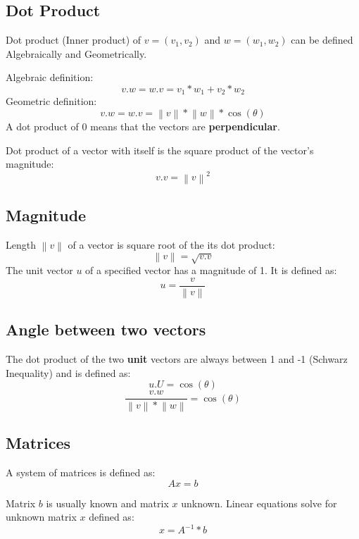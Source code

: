 \documentclass[10pt,a4paper]{article}
\begin{document}
\subsection{Dot Product}
Dot product (Inner product) of $v=(v_1, v_2)$ and $w=(w_1, w_2)$ can be defined Algebraically and Geometrically. \par
Algebraic definition:
$$v.w=w.v=v_1*w_1+v_2*w_2$$
Geometric definition:
$$v.w=w.v=\left \| v \right \|*\left \| w \right \|*\cos(\theta)$$
A dot product of 0 means that the vectors are \textbf{perpendicular}. \par 
Dot product of a vector with itself is the square product of the vector's magnitude:
$$v.v=\left \| v \right \|^2$$
\subsection{Magnitude}
Length $\left \| v \right \|$ of a vector is square root of the its dot product:
$$\left \| v \right \|=\sqrt{v.v}$$
The unit vector $u$ of a specified vector has a magnitude of 1. It is defined as:
$$u=\frac{v}{\left \| v \right \|}$$
\subsection{Angle between two vectors}
The dot product of the two \textbf{unit} vectors are always between 1 and -1 (Schwarz Inequality) and is defined as:
$$u.U=\cos(\theta)$$
$$\frac{v.w}{\left \| v \right \|*\left \| w \right \|}=\cos(\theta)$$
\subsection{Matrices}
A system of matrices is defined as: $$Ax=b$$ \par
Matrix $b$ is usually known and matrix $x$ unknown. Linear equations solve for unknown matrix $x$
defined as: $$x=A^{-1}*b$$
\end{document}

